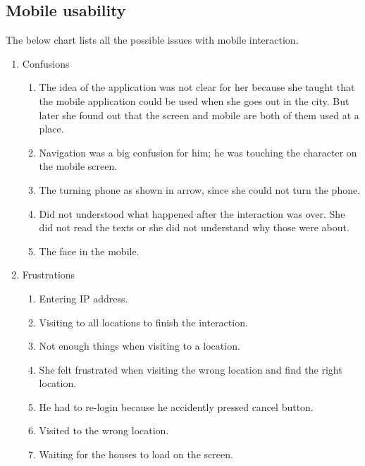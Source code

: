 \subsection{Mobile usability}
The below chart lists all the possible issues with mobile interaction.

\begin{enumerate}

\item Confusions
\begin{enumerate}
\item  The idea of the application was not clear for her because she taught that the mobile application could be used when she goes out in the city. But later she found out that the screen and mobile are both of them used at a place.
\item  Navigation was a big confusion for him; he was touching the character on the mobile screen.
\item  The turning phone as shown in arrow, since she could not turn the phone.
\item  Did not understood what happened after the interaction was over. She did not read the texts or she did not understand why those were about.
\item  The face in the mobile.
\end{enumerate}

\item Frustrations
\begin{enumerate}
\item  Entering IP address.
\item  Visiting to all locations to finish the interaction.
\item  Not enough things when visiting to a location.
\item  She felt frustrated when visiting the wrong location and find the right location.
\item  He had to re-login because he accidently pressed cancel button.
\item  Visited to the wrong location.
\item  Waiting for the houses to load on the screen.
\end{enumerate}


\end{enumerate}
